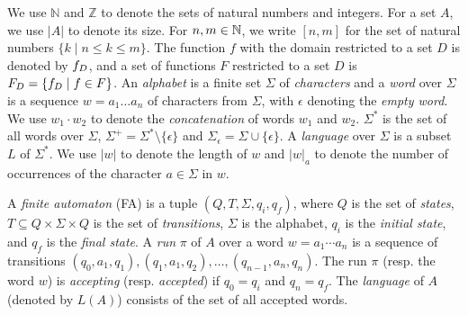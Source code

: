 \documentclass[sigplan,review,anonymous]{acmart}\settopmatter{printfolios=true,printccs=false,printacmref=false}
\begin{document}
We use $\mathbb{N}$ and $\mathbb{Z}$ to denote the sets of natural numbers and 
integers. For a set $A$, we use $|A|$ to denote its size. 
For $n,m\in\mathbb{N}$, we write $[n,m]$ for the set of natural numbers 
$\{k\mid n\leq k \leq m\}$. 
The function $f$ with the domain restricted to a set $D$ is denoted by $f_{D}$,
and a set of functions $F$ restricted to a set $D$ is $F_{D} = \{f_{D} \mid f \in F\}$.
An \emph{alphabet} is a finite set $\Sigma$ of \emph{characters} and a \emph{word} over $\Sigma$ is a sequence $w = a_1\ldots a_n$ of characters from $\Sigma$, with $\epsilon$ denoting the \emph{empty word}. 
We use $w_1\cdot w_2$ to denote the \emph{concatenation} of words $w_1$ and $w_2$.
$\Sigma^*$ is the set of all words over $\Sigma$, $\Sigma^+ = \Sigma^*\setminus \{\epsilon\}$ and $\Sigma_\epsilon = \Sigma\cup\{\epsilon\}$.
A \emph{language} over $\Sigma$ is a subset $L$ of $\Sigma^*$. 
%
We use $|w|$ to denote the length of $w$ and $|w|_a$ to denote the number of occurrences of the character $a\in \Sigma$ in $w$. 

A \emph{finite automaton} (FA) is a tuple $(Q,T,\Sigma,q_i,q_f)$, where $Q$ is the set of \emph{states}, $T\subseteq Q\times \Sigma \times Q $ is the set of \emph{transitions}, $\Sigma$ is the alphabet, $q_i$ is the \emph{initial state}, and $q_f$ is the \emph{final state}. 
A \emph{run} $\pi$ of $A$ over a word $w = a_1\cdots a_n$ is a sequence of transitions $(q_0,a_1,q_1),(q_1,a_1,q_2),\ldots,(q_{n-1},a_n,q_n)$. The run $\pi$ (resp. the word $w$) is \emph{accepting} (resp. \emph{accepted}) if $q_0 = q_i$ and $q_n = q_f$.
The \emph{language} of $A$ (denoted by $L(A)$) consists of  the set  of all accepted words.

%
\end{document}
